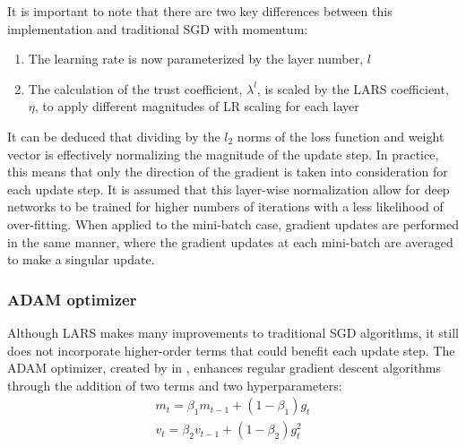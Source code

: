 
It is important to note that there are two key differences between this implementation and traditional SGD with momentum:
\begin{enumerate}
    \item The learning rate is now parameterized by the layer number, $l$
    \item The calculation of the trust coefficient, $\lambda^l$, is scaled by the LARS coefficient, $\eta$, to apply different magnitudes of LR scaling for each layer
\end{enumerate}
\vspace{4pt}

It can be deduced that dividing by the $l_2$ norms of the loss function and weight vector is effectively normalizing the magnitude of the update step. In practice, this means that only the direction of the gradient is taken into consideration for each update step. It is assumed that this layer-wise normalization allow for deep networks to be trained for higher numbers of iterations with a less likelihood of over-fitting. When applied to the mini-batch case, gradient updates are performed in the same manner, where the gradient updates at each mini-batch are averaged to make a singular update. 

\subsubsection{ADAM optimizer}
Although LARS makes many improvements to traditional SGD algorithms, it still does not incorporate higher-order terms that could benefit each update step. The ADAM optimizer, created by  in \cite{adam}, enhances regular gradient descent algorithms through the addition of two terms and two hyperparameters:
\vspace{-10pt}
\begin{align*}
m_{t} = \beta_{1}m_{t-1}+(1-\beta_{1})g_{t} \\
v_{t} = \beta_{2}v_{t-1}+(1-\beta_{2})g_{t}^2
\end{align*}

